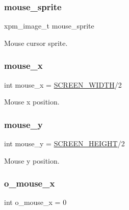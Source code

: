 \subsubsection{\texorpdfstring{mouse\+\_\+sprite}{mouse\_sprite}}
{\footnotesize\ttfamily xpm\+\_\+image\+\_\+t mouse\+\_\+sprite}



Mouse cursor sprite. 

\mbox{\label{group__Main-Menu_ga6c59af730728bf5260ef828aea2eebee}} 
\subsubsection{\texorpdfstring{mouse\+\_\+x}{mouse\_x}}
{\footnotesize\ttfamily int mouse\+\_\+x = \hyperlink{group__utils_ga2cd109632a6dcccaa80b43561b1ab700}{S\+C\+R\+E\+E\+N\+\_\+\+W\+I\+D\+TH}/2}



Mouse x position. 

\mbox{\label{group__Main-Menu_gab21653e455bbca86826aa5f628a5fdb2}} 
\subsubsection{\texorpdfstring{mouse\+\_\+y}{mouse\_y}}
{\footnotesize\ttfamily int mouse\+\_\+y = \hyperlink{group__utils_ga6974d08a74da681b3957b2fead2608b8}{S\+C\+R\+E\+E\+N\+\_\+\+H\+E\+I\+G\+HT}/2}



Mouse y position. 

\mbox{\label{group__Main-Menu_gad7f272c01893c7161961744eb23516d0}} 
\subsubsection{\texorpdfstring{o\+\_\+mouse\+\_\+x}{o\_mouse\_x}}
{\footnotesize\ttfamily int o\+\_\+mouse\+\_\+x = 0}



